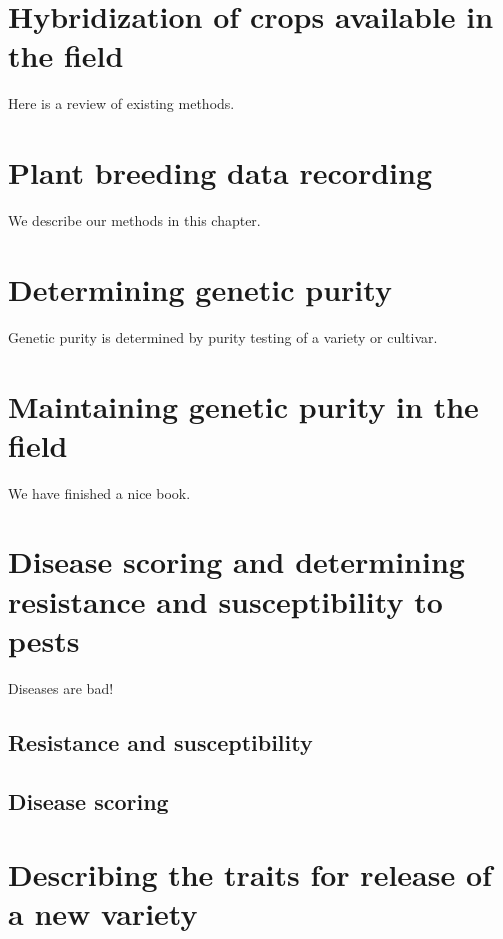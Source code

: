 \documentclass[]{book}
\begin{document}
\hypertarget{practical-2}{%
\chapter{Hybridization of crops available in the field}\label{practical-2}}

Here is a review of existing methods.

\hypertarget{practical-3}{%
\chapter{Plant breeding data recording}\label{practical-3}}

We describe our methods in this chapter.

\hypertarget{practical-4}{%
\chapter{Determining genetic purity}\label{practical-4}}

Genetic purity is determined by purity testing of a variety or cultivar.

\hypertarget{practical-5}{%
\chapter{Maintaining genetic purity in the field}\label{practical-5}}

We have finished a nice book.

\hypertarget{practical-6}{%
\chapter{Disease scoring and determining resistance and susceptibility to pests}\label{practical-6}}

Diseases are bad!

\hypertarget{resistance-and-susceptibility}{%
\section{Resistance and susceptibility}\label{resistance-and-susceptibility}}

\hypertarget{disease-scoring}{%
\section{Disease scoring}\label{disease-scoring}}

\hypertarget{practical-7}{%
\chapter{Describing the traits for release of a new variety}\label{practical-7}}
\end{document}
